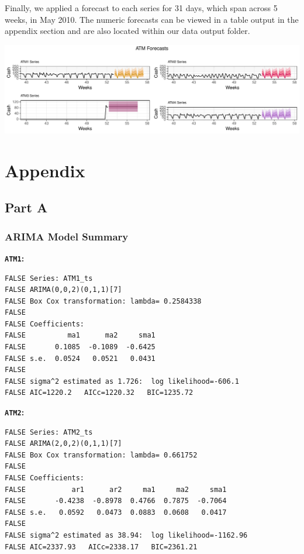 \documentclass[openany]{book}
\begin{document}
Finally, we applied a forecast to each series for 31 days, which span
across 5 weeks, in May 2010. The numeric forecasts can be viewed in a
table output in the appendix section and are also located within our
data output folder.

\includegraphics{Part-A-JM_JO_files/figure-latex/unnamed-chunk-8-1.pdf}

\hypertarget{Appendix}{%
\chapter*{Appendix}\label{Appendix}}

\hypertarget{Part-A}{%
\section*{Part A}\label{Part-A}}

\hypertarget{Part-A-arima}{%
\subsection*{ARIMA Model Summary}\label{Part-A-arima}}

\textbf{\texttt{ATM1}:}

\begin{verbatim}
FALSE Series: ATM1_ts 
FALSE ARIMA(0,0,2)(0,1,1)[7] 
FALSE Box Cox transformation: lambda= 0.2584338 
FALSE 
FALSE Coefficients:
FALSE          ma1      ma2     sma1
FALSE       0.1085  -0.1089  -0.6425
FALSE s.e.  0.0524   0.0521   0.0431
FALSE 
FALSE sigma^2 estimated as 1.726:  log likelihood=-606.1
FALSE AIC=1220.2   AICc=1220.32   BIC=1235.72
\end{verbatim}

\textbf{\texttt{ATM2}:}

\begin{verbatim}
FALSE Series: ATM2_ts 
FALSE ARIMA(2,0,2)(0,1,1)[7] 
FALSE Box Cox transformation: lambda= 0.661752 
FALSE 
FALSE Coefficients:
FALSE           ar1      ar2     ma1     ma2     sma1
FALSE       -0.4238  -0.8978  0.4766  0.7875  -0.7064
FALSE s.e.   0.0592   0.0473  0.0883  0.0608   0.0417
FALSE 
FALSE sigma^2 estimated as 38.94:  log likelihood=-1162.96
FALSE AIC=2337.93   AICc=2338.17   BIC=2361.21
\end{verbatim}
\end{document}
